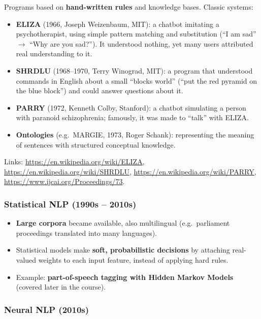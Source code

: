 Programs based on \textbf{hand-written rules} and knowledge bases. Classic systems:
\begin{itemize}[nosep]
  \item \textbf{ELIZA} (1966, Joseph Weizenbaum, MIT): a chatbot imitating a
        psychotherapist, using simple pattern matching and substitution
        (``I am sad'' $\to$ ``Why are you sad?''). It understood nothing, yet many users
        attributed real understanding to it.
  \item \textbf{SHRDLU} (1968--1970, Terry Winograd, MIT): a program that understood
        commands in English about a small ``blocks world'' (``put the red pyramid on the
        blue block'') and could answer questions about it.
  \item \textbf{PARRY} (1972, Kenneth Colby, Stanford): a chatbot simulating a person with
        paranoid schizophrenia; famously, it was made to ``talk'' with ELIZA.
  \item \textbf{Ontologies} (e.g.\ MARGIE, 1973, Roger Schank): representing the
        meaning of sentences with structured conceptual knowledge.
\end{itemize}
Links: \url{https://en.wikipedia.org/wiki/ELIZA}, \url{https://en.wikipedia.org/wiki/SHRDLU},
\url{https://en.wikipedia.org/wiki/PARRY}, \url{https://www.ijcai.org/Proceedings/73}.

\subsubsection{Statistical NLP (1990s -- 2010s)}

\begin{itemize}[nosep]
  \item \textbf{Large corpora} became available, also multilingual (e.g.\ parliament
        proceedings translated into many languages).
  \item Statistical models make \textbf{soft, probabilistic decisions} by attaching
        real-valued weights to each input feature, instead of applying hard rules.
  \item Example: \textbf{part-of-speech tagging with Hidden Markov Models} (covered
        later in the course).
\end{itemize}

\subsubsection{Neural NLP (2010s)}

